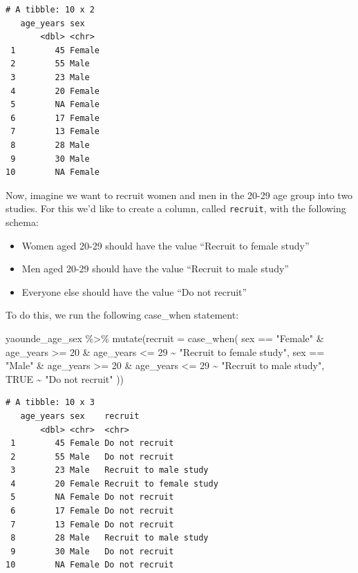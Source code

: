\documentclass[
  letterpaper,
  DIV=11,
  numbers=noendperiod]{scrreprt}
\newenvironment{Shaded}{\begin{snugshade}}{\end{snugshade}}
\newcommand{\AttributeTok}[1]{\textcolor[rgb]{0.40,0.45,0.13}{#1}}
\newcommand{\ConstantTok}[1]{\textcolor[rgb]{0.56,0.35,0.01}{#1}}
\newcommand{\DecValTok}[1]{\textcolor[rgb]{0.68,0.00,0.00}{#1}}
\newcommand{\FunctionTok}[1]{\textcolor[rgb]{0.28,0.35,0.67}{#1}}
\newcommand{\NormalTok}[1]{\textcolor[rgb]{0.00,0.23,0.31}{#1}}
\newcommand{\SpecialCharTok}[1]{\textcolor[rgb]{0.37,0.37,0.37}{#1}}
\newcommand{\StringTok}[1]{\textcolor[rgb]{0.13,0.47,0.30}{#1}}
\providecommand{\tightlist}{%
  \setlength{\itemsep}{0pt}\setlength{\parskip}{0pt}}\usepackage{longtable,booktabs,array}
\begin{document}
\begin{verbatim}
# A tibble: 10 x 2
   age_years sex   
       <dbl> <chr> 
 1        45 Female
 2        55 Male  
 3        23 Male  
 4        20 Female
 5        NA Female
 6        17 Female
 7        13 Female
 8        28 Male  
 9        30 Male  
10        NA Female
\end{verbatim}

Now, imagine we want to recruit women and men in the 20-29 age group
into two studies. For this we'd like to create a column, called
\texttt{recruit}, with the following schema:

\begin{itemize}
\tightlist
\item
  Women aged 20-29 should have the value ``Recruit to female study''
\item
  Men aged 20-29 should have the value ``Recruit to male study''
\item
  Everyone else should have the value ``Do not recruit''
\end{itemize}

To do this, we run the following case\_when statement:

\begin{Shaded}
\begin{Highlighting}[]
\NormalTok{yaounde\_age\_sex }\SpecialCharTok{\%\textgreater{}\%}
  \FunctionTok{mutate}\NormalTok{(}\AttributeTok{recruit =} \FunctionTok{case\_when}\NormalTok{(}
\NormalTok{    sex }\SpecialCharTok{==} \StringTok{"Female"} \SpecialCharTok{\&}\NormalTok{ age\_years }\SpecialCharTok{\textgreater{}=} \DecValTok{20} \SpecialCharTok{\&}\NormalTok{ age\_years }\SpecialCharTok{\textless{}=} \DecValTok{29} \SpecialCharTok{\textasciitilde{}} \StringTok{"Recruit to female study"}\NormalTok{,}
\NormalTok{    sex }\SpecialCharTok{==} \StringTok{"Male"} \SpecialCharTok{\&}\NormalTok{ age\_years }\SpecialCharTok{\textgreater{}=} \DecValTok{20} \SpecialCharTok{\&}\NormalTok{ age\_years }\SpecialCharTok{\textless{}=} \DecValTok{29} \SpecialCharTok{\textasciitilde{}} \StringTok{"Recruit to male study"}\NormalTok{,}
    \ConstantTok{TRUE} \SpecialCharTok{\textasciitilde{}} \StringTok{"Do not recruit"}
\NormalTok{  ))}
\end{Highlighting}
\end{Shaded}

\begin{verbatim}
# A tibble: 10 x 3
   age_years sex    recruit                
       <dbl> <chr>  <chr>                  
 1        45 Female Do not recruit         
 2        55 Male   Do not recruit         
 3        23 Male   Recruit to male study  
 4        20 Female Recruit to female study
 5        NA Female Do not recruit         
 6        17 Female Do not recruit         
 7        13 Female Do not recruit         
 8        28 Male   Recruit to male study  
 9        30 Male   Do not recruit         
10        NA Female Do not recruit         
\end{verbatim}
\end{document}
